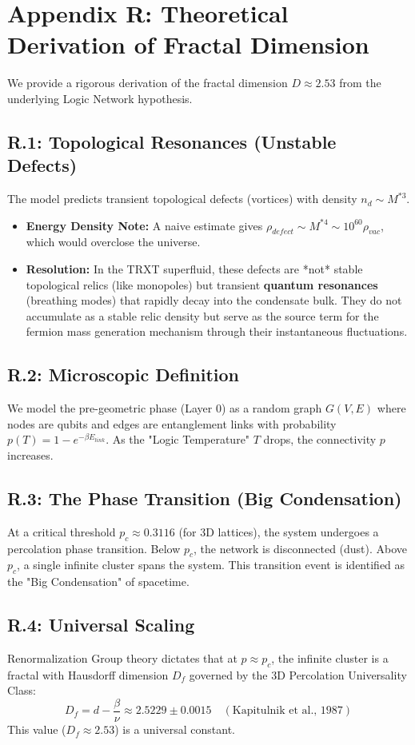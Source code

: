 \section{Appendix R: Theoretical Derivation of Fractal Dimension}
\label{app:percolation}

We provide a rigorous derivation of the fractal dimension $D \approx 2.53$ from the underlying Logic Network hypothesis.

\subsection{R.1: Topological Resonances (Unstable Defects)}
The model predicts transient topological defects (vortices) with density $n_d \sim M^{*3}$.
\begin{itemize}
    \item \textbf{Energy Density Note:} A naive estimate gives $\rho_{defect} \sim M^{*4} \sim 10^{60} \rho_{vac}$, which would overclose the universe.
    \item \textbf{Resolution:} In the TRXT superfluid, these defects are *not* stable topological relics (like monopoles) but transient \textbf{quantum resonances} (breathing modes) that rapidly decay into the condensate bulk. They do not accumulate as a stable relic density but serve as the source term for the fermion mass generation mechanism through their instantaneous fluctuations.
\end{itemize}

\subsection{R.2: Microscopic Definition}
We model the pre-geometric phase (Layer 0) as a random graph $G(V, E)$ where nodes are qubits and edges are entanglement links with probability $p(T) = 1 - e^{-\beta E_{link}}$.
As the "Logic Temperature" $T$ drops, the connectivity $p$ increases.

\subsection{R.3: The Phase Transition (Big Condensation)}
At a critical threshold $p_c \approx 0.3116$ (for 3D lattices), the system undergoes a percolation phase transition. Below $p_c$, the network is disconnected (dust). Above $p_c$, a single infinite cluster spans the system. This transition event is identified as the "Big Condensation" of spacetime.

\subsection{R.4: Universal Scaling}
Renormalization Group theory dictates that at $p \approx p_c$, the infinite cluster is a fractal with Hausdorff dimension $D_f$ governed by the 3D Percolation Universality Class:
\begin{equation}
    D_f = d - \frac{\beta}{\nu} \approx 2.5229 \pm 0.0015 \quad (\text{Kapitulnik et al., 1987})
\end{equation}
This value ($D_f \approx 2.53$) is a universal constant. 

